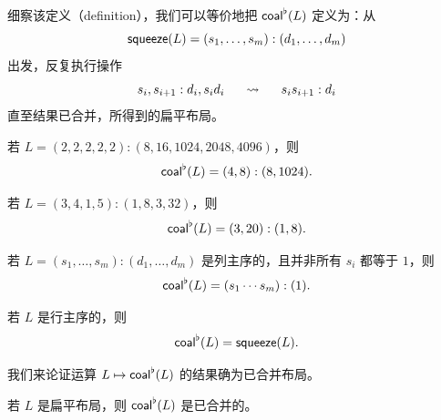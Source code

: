 \begin{observation}\label{flatcoalesceobservation}
    细察该定义（definition），我们可以等价地把 $\mathsf{coal}^\flat(L)$ 定义为：从
    \[
    \mathsf{squeeze}(L) = (s_1,\dots,s_m):(d_1,\dots,d_m)
    \]
    出发，反复执行操作
    \[
    s_i,s_{i+1} : d_i,s_id_i \hspace{0.2in} \rightsquigarrow \hspace{0.2in} s_is_{i+1} : d_i
    \]
    直至结果已合并，所得到的扁平布局。
\end{observation}

\begin{example}
    若 $L = (2,2,2,2,2):(8,16,1024,2048,4096)$，则
    \[
    \mathsf{coal}^\flat(L) = (4,8):(8,1024).
    \]
\end{example}

\begin{example}
    若 $L = (3,4,1,5):(1,8,3,32)$，则
    \[
    \mathsf{coal}^\flat(L) = (3,20):(1,8).
    \]
\end{example}

\begin{example}
    若 $L = (s_1,\dots,s_m):(d_1,\dots,d_m)$ 是列主序的，且并非所有 $s_i$ 都等于 $1$，则
    \[
    \mathsf{coal}^\flat(L) = (s_1\cdots s_m):(1).
    \]
\end{example}

\begin{example}
    若 $L$ 是行主序的，则
    \[
    \mathsf{coal}^\flat(L) = \mathsf{squeeze}(L).
    \]
\end{example}

我们来论证运算 $L \mapsto \mathsf{coal}^\flat(L)$ 的结果确为已合并布局。
\begin{lemma}
    若 $L$ 是扁平布局，则 $\mathsf{coal}^\flat(L)$ 是已合并的。
\end{lemma}


